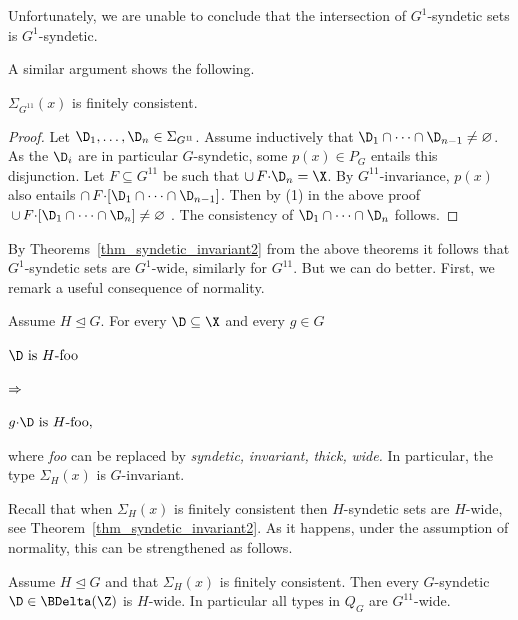 Unfortunately, we are unable to conclude that the intersection of $G^1$-syndetic sets is $G^1$-syndetic.

A similar argument shows the following.

\begin{theorem}\label{thm_gammaP}
   $\Sigma_{G^{1\!1}}(x)$ is finitely consistent.
\end{theorem}

\begin{proof}
  \def\medrel#1{\parbox[t]{5ex}{$\displaystyle\hfil #1$}}
  \def\ceq#1#2#3{\parbox[t]{23ex}{$\displaystyle #1$}\medrel{#2}{$\displaystyle #3$}}   
  Let $\D_1,\dots,\D_n\in\Sigma_{G^{1\!1}}$.
  Assume inductively that $\D_1\cap\dots\cap\D_{n-1}\neq\varnothing$.
  As the $\D_i$ are in particular $G$-syndetic, some $p(x)\in P_G$ entails this disjunction.
  Let $F\subseteq G^{1\!1}$ be such that $\cup\,F{\cdot}\D_n=\X$.
  By $G^{1\!1}$-invariance, $p(x)$ also entails $\cap\, F{\cdot}[\D_1\cap\dots\cap\D_{n-1}]$.
  Then by (1) in the above proof $\,\cup\,F{\cdot}[\D_1\cap\dots\cap\D_n]\neq\varnothing$ .
  The consistency of $\D_1\cap\dots\cap\D_n$ follows.
\end{proof}

By Theorems~\ref{thm_syndetic_invariant2} from the above theorems it follows that $G^1$-syndetic sets are $G^1$-wide, similarly for $G^{1\!1}$.
But we can do better.
First, we remark a useful consequence of normality.

\begin{remark}\label{rem_invariance_normalsubg}
\def\medrel#1{\parbox[t]{5ex}{$\displaystyle\hfil #1$}}
\def\ceq#1#2#3{\parbox[t]{20ex}{$\displaystyle #1$}\medrel{#2}{$\displaystyle #3$}}
  Assume $H\trianglelefteq G$.
  For every $\D\subseteq\X$ and every $g\in G$ \smallskip
  
  \ceq{\hfill\D\textrm{ is }H\textrm{-foo}}{\Rightarrow}{g{\cdot}\D\textrm{ is }H\textrm{-foo},} \smallskip
  
  where \textit{foo\/} can be replaced by \textit{syndetic,} \textit{invariant,} \textit{thick,} \textit{wide.}
  In particular, the type $\Sigma_H(x)$ is $G$-invariant.
\end{remark}

Recall that when $\Sigma_H(x)$ is finitely consistent then $H$-syndetic sets are $H$-wide, see Theorem~\ref{thm_syndetic_invariant2}.
As it happens, under the assumption of normality, this can be strengthened as follows.

\begin{proposition}\label{prop_Gsyndetic_Hthick1}
  Assume $H\trianglelefteq G$ and that $\Sigma_H(x)$ is finitely consistent.
  Then every $G$-syn\-detic $\D\in\BDelta(\Z)$ is $H$-wide.
  In particular all types in $Q_G$ are $G^{1\!1}$-wide.
\end{proposition}

